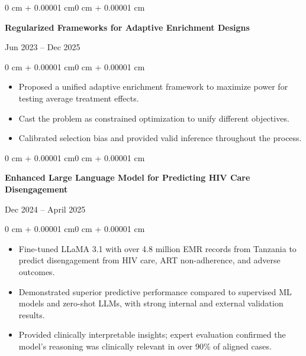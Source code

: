 \documentclass[10pt, letterpaper]{article}
\newenvironment{highlights}{
    \begin{itemize}[
        topsep=0.10 cm,
        parsep=0.10 cm,
        partopsep=0pt,
        itemsep=0pt,
        leftmargin=0 cm + 10pt
    ]
}{\end{itemize}}
\newenvironment{onecolentry}{
    \begin{adjustwidth}{0 cm + 0.00001 cm}{0 cm + 0.00001 cm}
}{\end{adjustwidth}}
\newenvironment{twocolentry}[2][]{
    \onecolentry
    \def\secondColumn{#2}
    \noindent\begin{minipage}[t]{\dimexpr\linewidth-4.7cm\relax}
}{
    \end{minipage}\hfill
    \begin{minipage}[t]{4.5cm}
        \raggedleft \secondColumn
    \end{minipage}
    \endonecolentry
}
\begin{document}
   \begin{twocolentry}{Jun 2023 -- Dec 2025}
        \textbf{Regularized Frameworks for  Adaptive Enrichment Designs}\\
    \end{twocolentry}
    \vspace{0.05 cm}
    \begin{onecolentry}
        \begin{highlights}
            \item Proposed a unified adaptive enrichment framework to maximize power for testing average treatment effects.
            \item Cast the problem as constrained optimization to unify different objectives.
            \item Calibrated selection bias and provided valid inference throughout the process.
        \end{highlights}
    \end{onecolentry}

\vspace{0.10 cm}
\begin{twocolentry}{Dec 2024 -- April 2025}
    \textbf{Enhanced Large Language Model for Predicting HIV Care Disengagement }\\
\end{twocolentry}
\vspace{0.05 cm}
\begin{onecolentry}
    \begin{highlights}
        \item Fine-tuned LLaMA 3.1 with over 4.8 million EMR records from Tanzania to predict disengagement from HIV care, ART non-adherence, and adverse outcomes.
        \item Demonstrated superior predictive performance compared to supervised ML models and zero-shot LLMs, with strong internal and external validation results.
        \item Provided clinically interpretable insights; expert evaluation confirmed the model's reasoning was clinically relevant in over 90\% of aligned cases.
    \end{highlights}
\end{onecolentry}
\vspace{0.10 cm}
\end{document}
